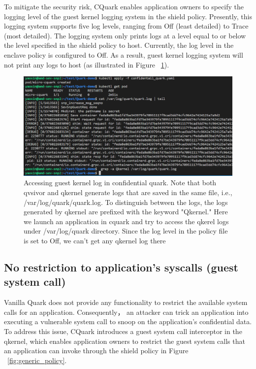 To mitigate the security risk, CQuark enables application owners to specify the logging level of the guest kernel logging system in the shield policy. Presently, this logging system supports five log levels, ranging from Off (least detailed) to Trace (most detailed). The logging system only prints 
logs at a level equal to or below the level specified in the shield policy to host.  Currently, the log level in the enclave policy is configured to Off. As a result, guest kernel logging system will not print any logs to host (as illustrated in Figure ~\ref{fig:cquark_qkernel_log}).
\begin{figure}[H]
    \centering
    \includegraphics[width=1\textwidth]{images/cquark_qkernel_log.png}
    \caption[Accessing guest kernel log in confidential quark]{Accessing guest kernel log in confidential quark.  Note that both qvsivor and qkernel generate logs that are saved in the same file, i.e., /var/log/quark/quark.log. To distinguish between the logs, the logs generated by qkernel are prefixed with the keyword "Qkernel."
    Here we launch an application in cquark and try to access the qkerel logs under /var/log/quark directory. Since the log level in the policy file is set to Off, we can't get any qkernel log there}
    \label{fig:cquark_qkernel_log}
\end{figure}

\subsection{No restriction to application's syscalls (guest system call)}
Vanilla Quark does not provide any functionality to restrict the available system calls for an application. Consequently， an attacker can trick an application into executing a vulnerable system call to snoop on the application's confidential data. To address this issue, CQuark introduces a guest 
system call interceptor in the qkernel, which enables application owners to restrict the guest system calls that an application can invoke through the shield policy in Figure ~\ref{fig:generic_policy}.

